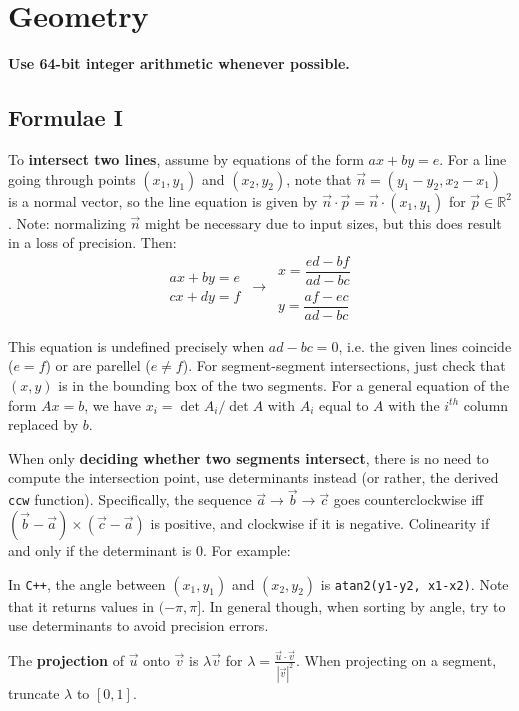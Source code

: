\documentclass[
	a4paper,
	landscape,
	10pt,
	article
]{article}
\begin{document}
\section{Geometry}
\textbf{\color{red} Use 64-bit integer arithmetic whenever possible.}

\subsection{Formulae I}
To \textbf{intersect two lines}, assume by equations of the form
$ax + by = e$. For a line going through points $(x_1, y_1)$ and
$(x_2, y_2)$, note that $\vec{n} = (y_1 - y_2, x_2 - x_1)$ is a normal vector,
so the line equation is given by $\vec{n}\cdot\vec{p}
	 = \vec{n} \cdot (x_1, y_1)$ for
$\vec{p} \in \mathbb{R}^2$. Note: normalizing $\vec{n}$ might be necessary due
to input sizes, but this does result in a loss of precision. Then:
$$\begin{aligned}ax+by=e\\cx+dy=f\end{aligned}
\,\to\,
\begin{aligned}x=\dfrac{ed-bf}{ad-bc}\\y=\dfrac{af-ec}{ad-bc}\end{aligned}$$

This equation is undefined precisely when $ad-bc = 0$, i.e. the given lines
coincide ($e=f$) or are parellel ($e \neq f$). For segment-segment
intersections, just check that $(x, y)$ is in the bounding box of the two
segments.
For a general equation of the form $Ax = b$, we have $x_i = \det A_i / \det A$
with $A_i$ equal to $A$ with the $i^{th}$ column replaced by $b$.

When only \textbf{deciding whether two segments intersect}, there is no need
to compute the intersection point, use determinants instead (or rather,
the derived \texttt{ccw} function). Specifically, the sequence $\vec{a}
	\to \vec{b} \to \vec{c}$ goes counterclockwise iff
$(\vec{b}-\vec{a})\times(\vec{c}-\vec{a})$ is positive, and clockwise if it
is negative. Colinearity if and only if the determinant is $0$. For example:



In \texttt{C++}, the angle between $(x_1, y_1)$ and $(x_2, y_2)$ is
\texttt{atan2(y1-y2, x1-x2)}. Note that it returns values in
$(-\pi, \pi]$. In general though, when sorting by angle, try to use
determinants to avoid precision errors.

The \textbf{projection} of $\vec{u}$ onto $\vec{v}$ is
$\lambda\vec{v}$ for $\lambda = \frac{\vec{u}\cdot\vec{v}}{|\vec{v}|^2}$.
When projecting on a segment, truncate $\lambda$ to $[0, 1]$.
\end{document}
